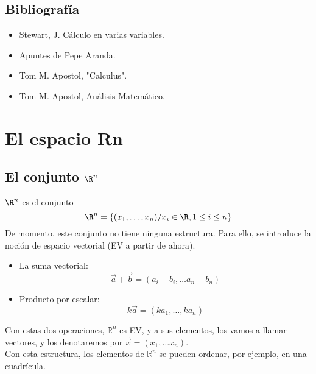 \documentclass{../Calculo.tex}
\begin{document}
\section{Bibliografía}
\begin{itemize}
	\item Stewart, J. Cálculo en varias variables.
	\item Apuntes de Pepe Aranda.
	\item Tom M. Apostol, "Calculus".
	\item Tom M. Apostol, Análisis Matemático.
\end{itemize}
\pagebreak
\chapter{El espacio Rn}
\section{El conjunto $\R^{n}$}
$\R^{n}$ es el conjunto
\[
		\R^{n} =\{ ( x_1,\dots ,x_{n}) / x_{i} \in \R, 1 \leq i \leq n\}
\]
De momento, este conjunto no tiene ninguna estructura. Para ello, se introduce
la noción de espacio vectorial (EV a partir de ahora).
\begin{itemize}
	\item La suma vectorial:
	\[
		\vec{a} + \vec{b} = (a_{i}+b_{i},\dots a_{n}+b_{n})	
	\]
	\item Producto por escalar:
		\[
			k \vec{a} = (ka_{1},\dots ,ka_{n})
		\]
\end{itemize}
Con estas dos operaciones, $\mathbb{R}^{n}$ es EV, y a sus elementos, los vamos a
llamar vectores, y los denotaremos por $\vec{x}=(x_{1},\dots x_{n})$.\\
Con esta estructura, los elementos de $\mathbb{R}^{n}$ se pueden ordenar, por
ejemplo, en una cuadrícula.
\begin{center}


\end{center}
\end{document}

